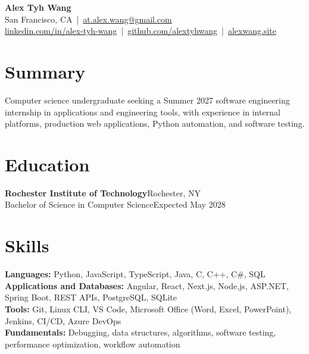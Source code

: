 \documentclass[10pt,letterpaper]{article}
\begin{document}
\begin{center}
{\Large\textbf{Alex Tyh Wang}}\\
San Francisco, CA \,|\, \href{mailto:at.alex.wang@gmail.com}{at.alex.wang@gmail.com}\\
\small\href{https://www.linkedin.com/in/alex-tyh-wang/}{linkedin.com/in/alex-tyh-wang} \,|\, \href{https://github.com/alextyhwang}{github.com/alextyhwang} \,|\, \href{https://alexwang.site}{alexwang.site}
\end{center}
\section*{Summary}
Computer science undergraduate seeking a Summer 2027 software engineering internship in applications and engineering tools, with experience in internal platforms, production web applications, Python automation, and software testing.
\section*{Education}
\textbf{Rochester Institute of Technology}\hfill Rochester, NY\\
Bachelor of Science in Computer Science\hfill Expected May 2028
\section*{Skills}
\textbf{Languages:} Python, JavaScript, TypeScript, Java, C, C++, C\#, SQL\\
\textbf{Applications and Databases:} Angular, React, Next.js, Node.js, ASP.NET, Spring Boot, REST APIs, PostgreSQL, SQLite\\
\textbf{Tools:} Git, Linux CLI, VS Code, Microsoft Office (Word, Excel, PowerPoint), Jenkins, CI/CD, Azure DevOps\\
\textbf{Fundamentals:} Debugging, data structures, algorithms, software testing, performance optimization, workflow automation
\end{document}
